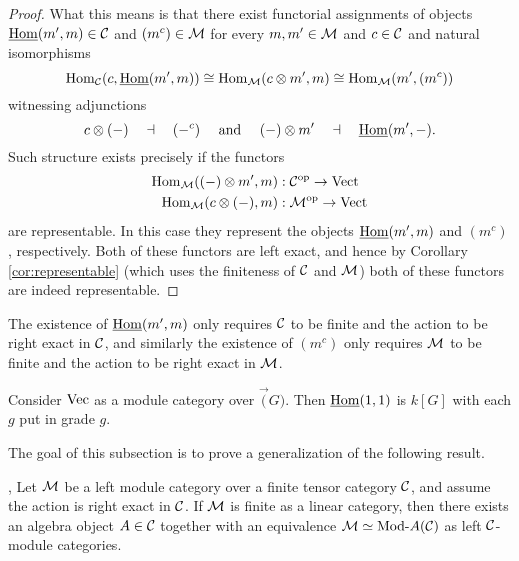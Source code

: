 \documentclass{amsart}
\begin{document}
\begin{proof}
	What this means is that there exist functorial assignments of objects $\IHom(m', m) \in \cC$ and $(m^c) \in \cM$ for every $m,m' \in \cM$ and $c \in \cC$ and natural isomorphisms
	\begin{equation*}
		\Hom_\cC(c, \IHom(m', m)) \cong \Hom_\cM(c \otimes m', m) \cong \Hom_\cM( m', (m^c))
	\end{equation*}
	witnessing adjunctions
	\begin{equation*}
			c \otimes (-) \quad \dashv\quad (-^c) \quad \textrm{ and } \quad (-) \otimes m' \quad \dashv \quad \IHom(m', -).
	\end{equation*}
Such structure exists precisely if the functors
\begin{align*}
	\Hom_\cM((-)\otimes m', m): \; & \cC^\op \to \Vect \\
	\Hom_\cM(c \otimes (-), m): \; & \cM^\op \to \Vect
\end{align*}
are representable. In this case they represent the objects $\IHom(m', m)$ and $(m^c)$, respectively. Both of these functors are left exact, and hence by Corollary \ref{cor:representable} (which uses the finiteness of $\cC$ and $\cM$) both of these functors are indeed representable.  %
\end{proof}

\begin{remark}
	The existence of $\IHom(m', m)$ only requires $\cC$ to be finite and the action to be right exact in $\cC$, and similarly the existence of $(m^c)$ only requires $\cM$ to be finite and the action to be right exact in $\cM$.
\end{remark}

\begin{example}
Consider $\Vec$ as a module category over $\Vec(G)$.  Then $\IHom(1,1)$ is $k[G]$ with each $g$ put in grade $g$.
\end{example}



The goal of this subsection is to prove a generalization of the following result.

\begin{theorem}{\cite[Thm 2.11.6]{EGNO}, \cite[Thm 1]{MR1976459}} \label{thm:EGNO2.11.6}
	Let $\cM$ be a left module category over a finite tensor category $\cC$, and assume the action is right exact in $\cC$. If $\cM$ is finite as a linear category, then there exists an algebra object $A \in \cC$ together with an equivalence $\cM \simeq \Mod{}{A} (\cC)$ as left $\cC$-module categories. 
\end{theorem}
\end{document}
